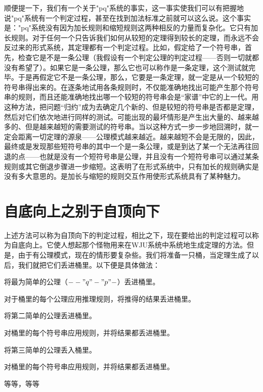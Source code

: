 顺便提一下，我们有一个关于"pq"系统的事实，这一事实使我们可以有把握地说"pq"系统有一个判定过程，甚至在找到加法标准之前就可以这么说。这个事实是："pq"系统没有因为加长规则和缩短规则这两种相反的力量而复杂化。它只有加长规则。对于任何一个只告诉我们如何从较短的定理得到较长的定理，而永远不会反过来的形式系统，其定理都有一个判定过程。比如，假定给了一个符号串，首先，检查它是不是一条公理（我假设有一个判定公理的判定过程——否则一切就都没有希望了）。如果它是一条公理，那么它也可以称作是一条定理，这个测试就完毕。于是再假定它不是一条公理，那么，它要是一条定理，就一定是从一个较短的符号串得出来的。在逐条地试用各条规则时，不仅能准确地找出可能产生那个符号串的规则，而且还能准确地找出哪一个较短的符号串会是“家谱”中它的上一代。用这种方法，把问题“归约”成为去确定几个新的、但是较短的符号串是否都是定理，然后对它们依次地进行同样的测试。可能出现的最坏情形是产生出大量的、越来越多的、但是越来越短的需要测试的符号串。当以这种方式一步一步地回溯时，就一定会距离一切定理的源泉——公理模式越来越近。越来越短不会是无限的，因此，最终或是发现那些短符号串的其中一个是一条公理，或是到达了某一个无法再往回退的点——也就是没有一个短符号串是公理，并且没有一个短符号串可以通过某条规则或其它倒退步骤进一步缩短。这表明了在形式系统中，只有加长的规则确实是没有多大意思的。是加长与缩短的规则交互作用使形式系统具有了某种魅力。

\section{自底向上之别于自顶向下}

上述方法可以称为自顶向下的判定过程，相比之下，现在要给出的判定过程可以称为自底向上。它使人想起那个怪物用来在WJU系统中系统地生成定理的方法。但是，由于有公理模式，现在的情形要复杂些。我们将准备一只桶，当定理生成了以后，我们就把它们丢进桶里。以下便是具体做法：
\begin{description}[labelwidth=2\ccwd, labelsep=0pt,
  align=fillright, leftmargin=4\ccwd]
\item[(1a)]将最为简单的公理（$--"q"-"p"-$）丢进桶里。
\item[(1b)]对于桶里的每个公理应用推理规则，将推得的结果丢进桶里。
\item[(2a)]将第二简单的公理丢进桶里。
\item[(2b)]对桶里的每个符号串应用规则，并将结果都丢进桶里。
\item[(3a)]将第三简单的公理丢入桶里。
\item[(3b)]对桶里的每个符号串应用规则，并将结果都丢进桶里。
\item[]等等，等等
\end{description}


